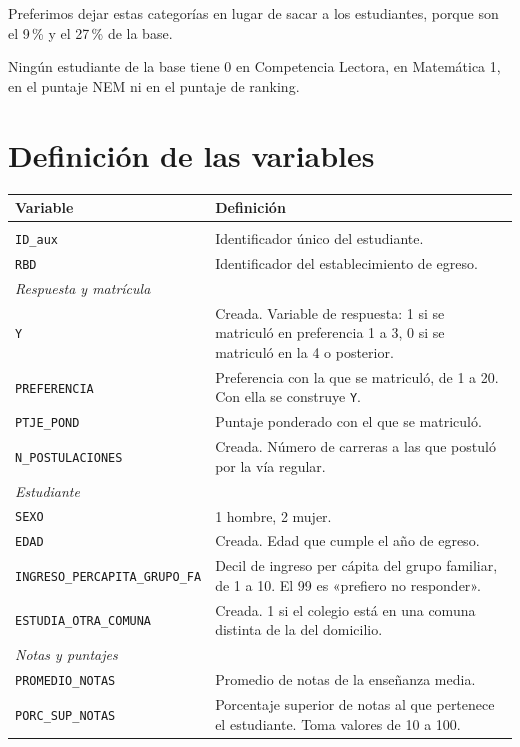 \documentclass[11pt,letterpaper]{article}
\begin{document}
Preferimos dejar estas categorías en lugar de sacar a los estudiantes, porque son el 9\,\% y el 27\,\% de la base.

Ningún estudiante de la base tiene 0 en Competencia Lectora, en Matemática 1, en el puntaje NEM ni en el puntaje de ranking.

\section{Definición de las variables}

\begin{longtable}{p{5.2cm}p{9.8cm}}
\toprule
Variable & Definición \\
\midrule
\endhead
\bottomrule
\endfoot
\multicolumn{2}{l}{\textit{Identificadores}} \\
\texttt{ID\_aux} & Identificador único del estudiante. \\
\texttt{RBD} & Identificador del establecimiento de egreso. \\
\midrule
\multicolumn{2}{l}{\textit{Respuesta y matrícula}} \\
\texttt{Y} & Creada. Variable de respuesta: 1 si se matriculó en preferencia 1 a 3, 0 si se matriculó en la 4 o posterior. \\
\texttt{PREFERENCIA} & Preferencia con la que se matriculó, de 1 a 20. Con ella se construye \texttt{Y}. \\
\texttt{PTJE\_POND} & Puntaje ponderado con el que se matriculó. \\
\texttt{N\_POSTULACIONES} & Creada. Número de carreras a las que postuló por la vía regular. \\
\midrule
\multicolumn{2}{l}{\textit{Estudiante}} \\
\texttt{SEXO} & 1 hombre, 2 mujer. \\
\texttt{EDAD} & Creada. Edad que cumple el año de egreso. \\
\texttt{INGRESO\_PERCAPITA\_GRUPO\_FA} & Decil de ingreso per cápita del grupo familiar, de 1 a 10. El 99 es «prefiero no responder». \\
\texttt{ESTUDIA\_OTRA\_COMUNA} & Creada. 1 si el colegio está en una comuna distinta de la del domicilio. \\
\midrule
\multicolumn{2}{l}{\textit{Notas y puntajes}} \\
\texttt{PROMEDIO\_NOTAS} & Promedio de notas de la enseñanza media. \\
\texttt{PORC\_SUP\_NOTAS} & Porcentaje superior de notas al que pertenece el estudiante. Toma valores de 10 a 100. \\

\end{longtable}
\end{document}
